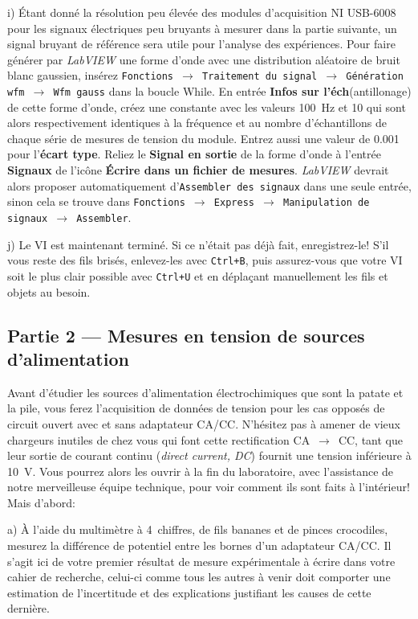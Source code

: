 \documentclass[canadien,12pt,oneside,letterpaper]{article}
\begin{document}
i) Étant donné la résolution peu élevée des modules d'acquisition NI USB-6008 pour les signaux électriques peu bruyants à mesurer dans la partie suivante, un signal bruyant de référence sera utile pour l'analyse des expériences. Pour faire générer par \textit{LabVIEW} une forme d'onde avec une distribution aléatoire de bruit blanc gaussien, insérez \texttt{Fonctions $\rightarrow$ Traitement du signal $\rightarrow$ Génération wfm $\rightarrow$ Wfm gauss} dans la boucle While. En entrée \textbf{Infos sur l'éch}(antillonage) de cette forme d'onde, créez une constante avec les valeurs 100~Hz et 10 qui sont alors respectivement identiques à la fréquence et au nombre d'échantillons de chaque série de mesures de tension du module. Entrez aussi une valeur de 0.001 pour l'\textbf{écart type}. Reliez le \textbf{Signal en sortie} de la forme d'onde à l'entrée \textbf{Signaux} de l'icône \textbf{Écrire dans un fichier de mesures}. \textit{LabVIEW} devrait alors proposer automatiquement d'\texttt{Assembler des signaux} dans une seule entrée, sinon cela se trouve dans \texttt{Fonctions $\rightarrow$ Express $\rightarrow$ Manipulation de signaux $\rightarrow$ Assembler}.

j) Le VI est maintenant terminé. Si ce n'était pas déjà fait, enregistrez-le! S'il vous reste des fils brisés, enlevez-les avec \texttt{Ctrl+B}, puis assurez-vous que votre VI soit le plus clair possible avec \texttt{Ctrl+U} et en déplaçant manuellement les fils et objets au besoin.


\subsection{Partie 2 --- Mesures en tension de sources d'alimentation}

Avant d'étudier les sources d'alimentation électrochimiques que sont la patate et la pile, vous ferez l'acquisition de données de tension pour les cas opposés de circuit ouvert avec et sans adaptateur CA/CC. N'hésitez pas à amener de vieux chargeurs inutiles de chez vous qui font cette rectification CA~$\rightarrow$~CC, tant que leur sortie de courant continu (\textit{direct current, DC}) fournit une tension inférieure à 10~V. Vous pourrez alors les ouvrir à la fin du laboratoire, avec l'assistance de notre merveilleuse équipe technique, pour voir comment ils sont faits à l'intérieur! Mais d'abord:

a) À l'aide du multimètre à 4\textonehalf~chiffres, de fils bananes et de pinces crocodiles, mesurez la différence de potentiel entre les bornes d'un adaptateur CA/CC. Il s'agit ici de votre premier résultat de mesure expérimentale à écrire dans votre cahier de recherche, celui-ci comme tous les autres à venir doit comporter une estimation de l'incertitude et des explications justifiant les causes de cette dernière.
\end{document}
